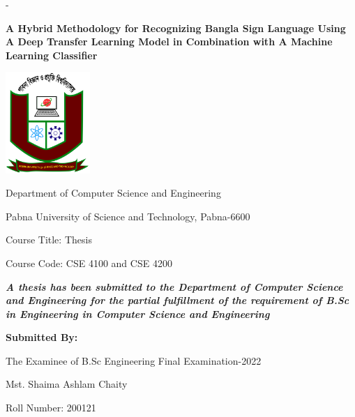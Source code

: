 \setlength{\parskip}{0pt}
%
\begin{titlingpage}
\begin{SingleSpace}
\calccentering{\unitlength} 
\begin{adjustwidth*}{\unitlength}{-\unitlength}

\begin{center}
    {\textbf{A Hybrid Methodology for Recognizing Bangla Sign Language Using A Deep Transfer Learning Model in Combination with A Machine Learning Classifier}}
\end{center}

\vspace{0.5cm}

\begin{center}
\includegraphics[width=32mm]{logos/pust_logo.jpg} %

Department of Computer Science and Engineering

Pabna University of Science and Technology, Pabna-6600

\vspace{0.5cm}

Course Title: Thesis

Course Code: CSE 4100 and CSE 4200


\vspace{0.5cm}

{\em \textbf{A thesis has been submitted to the Department of Computer Science and Engineering for the partial fulfillment of the requirement of B.Sc in Engineering in Computer Science and Engineering}
}

\vspace{1cm}
{\textbf {Submitted By:}}

The Examinee of B.Sc Engineering Final Examination-2022

Mst. Shaima Ashlam Chaity

Roll Number: 200121


\end{center}
\end{adjustwidth*}
\end{SingleSpace}
\end{titlingpage}
